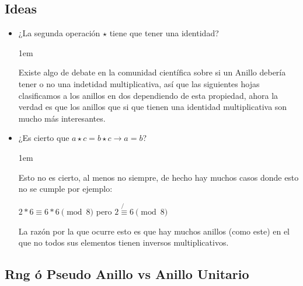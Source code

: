 \documentclass[12pt, fleqn]{report}                             %
\newenvironment{SmallIndentation}[1][0.75em]                    %
        {\begin{adjustwidth}{#1}{}\begin{footnotesize}}             %
        {\end{footnotesize}\end{adjustwidth}}                       %
\theoremstyle{break}                                            %
\begin{document}
            \clearpage
            \subsection{Ideas}

                \begin{itemize}
                    \item ¿La segunda operación $\star$ tiene que tener una identidad?

                    \begin{SmallIndentation}[1em]
                        Existe algo de debate en la comunidad científica sobre si un Anillo debería tener
                        o no una indetidad multiplicativa, así que las siguientes hojas clasificamos
                        a los anillos en dos dependiendo de esta propiedad, ahora la verdad es que los anillos
                        que si que tienen una identidad multiplicativa son mucho más interesantes.
                    \end{SmallIndentation}

                    \item ¿Es cierto que $a \star c = b \star c \to a = b$?

                    \begin{SmallIndentation}[1em]
                        Esto no es cierto, al menos no siempre, de hecho hay muchos casos donde esto no se
                        cumple por ejemplo:

                        $2 * 6 \equiv 6 *6 \pmod{8}$ pero $2 \not{\equiv} 6 \pmod{8}$

                        La razón por la que ocurre esto es que hay muchos anillos (como este) en el que no
                        todos sus elementos tienen inversos multiplicativos.

                    \end{SmallIndentation}


                \end{itemize}



            \subsection{Rng ó Pseudo Anillo vs Anillo Unitario}
\end{document}
